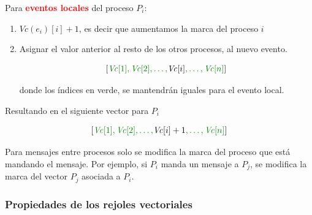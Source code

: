 Para \textcolor{red}{\textbf{eventos locales}} del proceso $P_i$:

\begin{enumerate}[label=\textbf{Paso \arabic*:}, wide, labelindent=0pt]
    \item $Vc(e_i)[i] + 1$, es decir que aumentamos la marca del proceso $i$
    
    \item Asignar el valor anterior al resto de los otros procesos, al nuevo evento.
    
    \[
    \left[ \textstyle
    \textcolor{green!50!black}{
        \mathit{Vc}[1], \mathit{Vc}[2], \dots, 
    }
    \textcolor{black}{
        \mathit{Vc}[i]
    }
    \textcolor{green!50!black}{
        , \dots, \mathit{Vc}[n]
    }
    \right]
    \]
    
    donde los índices en verde, se mantendrán iguales para el evento local.
\end{enumerate}

Resultando en el siguiente vector para $P_i$

\[
\left[ \textstyle
\textcolor{green!50!black}{
    \mathit{Vc}[1], \mathit{Vc}[2], \dots, 
}
\textcolor{black}{
    \mathit{Vc}[i] + 1
}
\textcolor{green!50!black}{
    , \dots, \mathit{Vc}[n]
}
\right]
\]

Para mensajes entre procesos solo se modifica la marca del proceso que está mandando el mensaje. Por ejemplo, si $P_i$ manda un mensaje a $P_j$, se modifica la marca del vector $P_j$ asociada a $P_i$.

 \subsubsection{Propiedades de los rejoles vectoriales}

